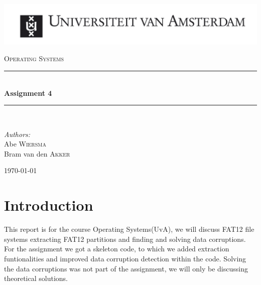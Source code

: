 \documentclass[pdftex,12pt,a4paper]{article}
\newcommand{\HRule}{\rule{\linewidth}{0.5mm}}
\begin{document}
\begin{titlepage}

\begin{flushleft}
\includegraphics[trim=23mm 0mm 0mm 0mm, width=1.2\textwidth]{./logo}\\[1cm]   
\end{flushleft}
\begin{center}
\textsc{\Large Operating Systems}\\[0.5cm]


\HRule \\[0.4cm]
{ \huge \bfseries Assignment 4}\\[0.4cm]

\HRule \\[1.5cm]

\begin{minipage}{0.4\textwidth}
\begin{flushleft} \large
\emph{Authors:}\\
 Abe \textsc{Wiersma}\\
 Bram van den \textsc{Akker}
\end{flushleft}
\end{minipage}
\begin{minipage}{0.4\textwidth}
\begin{flushright} \large
\end{flushright}
\end{minipage}

\vfill

{\large \today}

\end{center}
\end{titlepage}
\pagebreak

\tableofcontents
\pagebreak
\section{Introduction}
This report is for the course Operating Systems(UvA), we will discuss FAT12 file systems extracting FAT12 partitions and finding and solving data corruptions. For the assignment we got a skeleton code, to which we added extraction funtionalities and improved data corruption detection within the code. Solving the data corruptions was not part of the assignment, we will only be discussing theoretical solutions.
\end{document}
